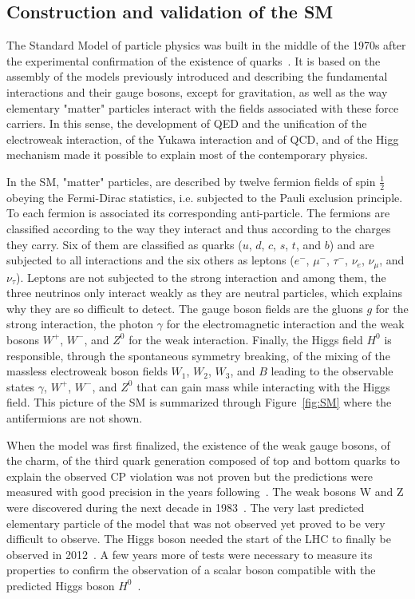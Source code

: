 	\subsection{Construction and validation of the \acl{SM}}
	\label{chapt2:ssec:model}
	
	The Standard Model of particle physics was built in the middle of the 1970s after the experimental confirmation of the existence of quarks~\cite{SMWIKI}. It is based on the assembly of the models previously introduced and describing the fundamental interactions and their gauge bosons, except for gravitation, as well as the way elementary "matter" particles interact with the fields associated with these force carriers. In this sense, the development of QED and the unification of the electroweak interaction, of the Yukawa interaction and of QCD, and of the Higg mechanism made it possible to explain most of the contemporary physics.
	
	In the SM, "matter" particles, are described by twelve fermion fields of spin $\frac{1}{2}$ obeying the Fermi-Dirac statistics, i.e. subjected to the Pauli exclusion principle. To each fermion is associated its corresponding anti-particle. The fermions are classified according to the way they interact and thus according to the charges they carry. Six of them are classified as quarks ($u$, $d$, $c$, $s$, $t$, and $b$) and are subjected to all interactions and the six others as leptons ($e^-$, $\mu^-$, $\tau^-$, $\nu_e$, $\nu_\mu$, and $\nu_\tau$). Leptons are not subjected to the strong interaction and among them, the three neutrinos only interact weakly as they are neutral particles, which explains why they are so difficult to detect. The gauge boson fields are the gluons $g$ for the strong interaction, the photon $\gamma$ for the electromagnetic interaction and the weak bosons $W^+$, $W^-$, and $Z^0$ for the weak interaction. Finally, the Higgs field $H^0$ is responsible, through the spontaneous symmetry breaking, of the mixing of the massless electroweak boson fields $W_1$, $W_2$, $W_3$, and $B$ leading to the observable states $\gamma$, $W^+$, $W^-$, and $Z^0$ that can gain mass while interacting with the Higgs field. This picture of the SM is summarized through Figure~\ref{fig:SM} where the antifermions are not shown.
	
	When the model was first finalized, the existence of the weak gauge bosons, of the charm, of the third quark generation composed of top and bottom quarks to explain the observed CP violation was not proven but the predictions were measured with good precision in the years following~\cite{TING1974,RICHTER1974,HERB1977,ABASHI1995,ABE1995}. The weak bosons W and Z were discovered during the next decade in 1983~\cite{UA1W1983,UA2W1983,UA1Z1983,UA2Z1983}. The very last predicted elementary particle of the model that was not observed yet proved to be very difficult to observe. The Higgs boson needed the start of the LHC to finally be observed in 2012~\cite{ATLAS2012,CMS2012}. A few years more of tests were necessary to measure its properties to confirm the observation of a scalar boson compatible with the predicted Higgs boson $H^0$~\cite{HIGGS2015}.
	
